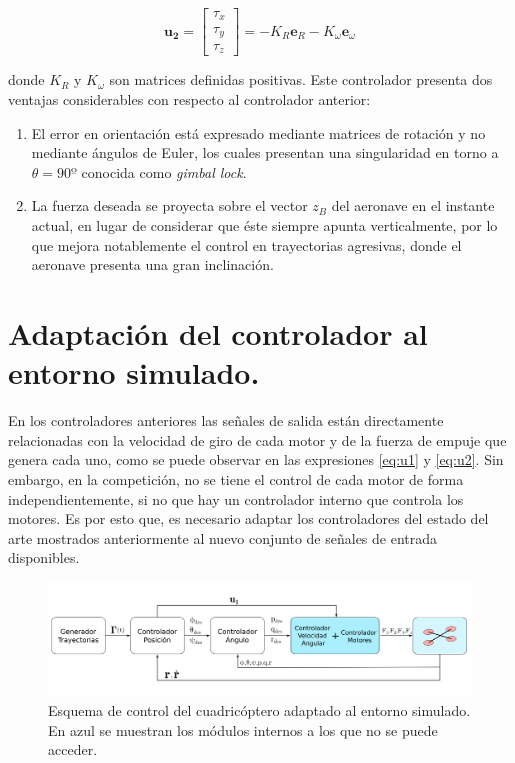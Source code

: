 \begin{equation}
	\label{eq:u2_non_linearized}\mathbf{u_2}=
\begin{bmatrix}
	\tau_x\\\tau_y\\\tau_z 
\end{bmatrix}= -K_R	\mathbf{e}_R - K_\omega	\mathbf{e}_\omega
\end{equation}

donde $K_R$ y $K_\omega$ son matrices definidas positivas. Este controlador presenta dos ventajas considerables con respecto al controlador anterior:
\begin{enumerate}
	\item El error en orientación está expresado mediante matrices de rotación y no mediante ángulos de Euler, los cuales presentan una singularidad en torno a $\theta = 90º$ conocida como \textit{gimbal lock}.
	\item La fuerza deseada se proyecta sobre el vector $z_B$ del aeronave en el instante actual, en lugar de considerar que éste siempre apunta verticalmente, por lo que mejora notablemente el control en trayectorias agresivas, donde el
	aeronave presenta una gran inclinación.
\end{enumerate}


\section{Adaptación del controlador al entorno simulado.}

En los controladores anteriores las señales de salida están directamente relacionadas con la velocidad de giro de cada motor y de la fuerza de empuje que genera cada uno, como se puede observar en las expresiones \ref{eq:u1} y \ref{eq:u2}. Sin embargo, en la competición, no se tiene el control de cada motor de forma independientemente, si no que hay un controlador interno que controla los motores. Es por esto que, es necesario adaptar los controladores del estado del arte mostrados anteriormente al nuevo conjunto de señales de entrada disponibles.

\begin{figure}[htb!]
	\centering
	\includegraphics[width=\textwidth]{imagenes/diagramaControl2}
	\caption{Esquema de control del cuadricóptero adaptado al entorno simulado. En azul se muestran los módulos internos a los que no se puede acceder. }
	\label{control:2}
\end{figure}



